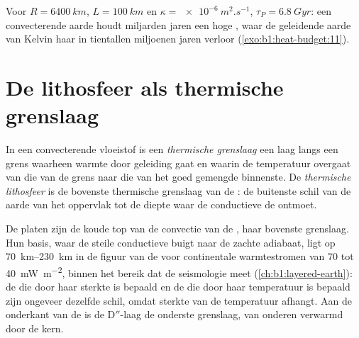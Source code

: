 Voor $R = \qty{6400}{km}$, $L = \qty{100}{km}$ en $\kappa =
\qty{e-6}{m^2.s^{-1}}$, $\tau_P = \qty{6.8}{Gyr}$: een convecterende aarde houdt miljarden jaren een hoge , waar de geleidende aarde van Kelvin haar in tientallen miljoenen jaren verloor (\cref{exo:b1:heat-budget:11}).

\section{De lithosfeer als thermische grenslaag}\label{sec:b1:heat-budget:boundary-layer}

\begin{definition}\label{def:b1:heat-budget:boundary-layer}
In een convecterende vloeistof is een \emph{thermische grenslaag} een laag langs een grens waarheen warmte door geleiding gaat en waarin de temperatuur overgaat van die van de grens naar die van het goed gemengde binnenste. De \emph{thermische lithosfeer} is de bovenste thermische grenslaag van de : de buitenste schil van de aarde van het oppervlak tot de diepte waar de conductieve  de  ontmoet.
\end{definition}

De platen zijn de koude top van de convectie van de , haar bovenste grenslaag. Hun basis, waar de steile conductieve  buigt naar de zachte adiabaat, ligt op \qtyrange{70}{230}{km} in de figuur van de  voor continentale warmtestromen van 70 tot \qty{40}{mW.m^{-2}}, binnen het bereik dat de seismologie meet (\cref{ch:b1:layered-earth}): de  die door haar sterkte is bepaald en de  die door haar temperatuur is bepaald zijn ongeveer dezelfde schil, omdat sterkte van de temperatuur afhangt. Aan de onderkant van de  is de D$''$-laag de onderste grenslaag, van onderen verwarmd door de kern.

